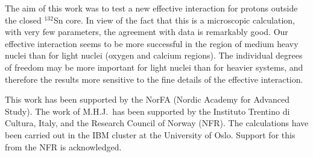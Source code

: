 The aim of this work was to test a new effective interaction for
protons outside the closed $^{132}$Sn core. In view of the fact that 
this is a microscopic calculation, with very few 
parameters, the agreement with data is remarkably good.
Our effective interaction seems to be more successful in the region of 
medium heavy nuclei than for light nuclei (oxygen and calcium regions). 
The individual degrees of freedom may be more important for light nuclei than 
for heavier systems, and therefore the results more sensitive to 
the fine details of the effective interaction.

This work has been supported by the NorFA (Nordic Academy for Advanced Study).
The work of M.H.J.\ has been supported
by  the Instituto Trentino di Cultura, Italy, and the Research 
Council of Norway (NFR). The calculations have been 
carried out in the IBM cluster at the University of Oslo. Support for this
from the NFR is acknowledged.

